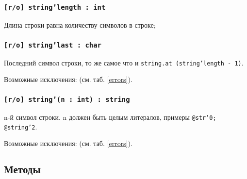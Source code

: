 \subsubsection{\texttt{[r/o] string'length : int}}

Длина строки равна количеству символов в строке;

\subsubsection{\texttt{[r/o] string'last : char}}

Последний символ строки, то же самое что и \texttt{string.at (string'length - 1)}.

Возможные исключения:  (см. таб. \ref{errors}).

\subsubsection{\texttt{[r/o] string'(n : int) : string}}

n-й символ строки. n должен быть целым литералов, примеры \texttt{@str'0; @string'2}.

Возможные исключения:  (см. таб. \ref{errors}).

\subsection{Методы}

